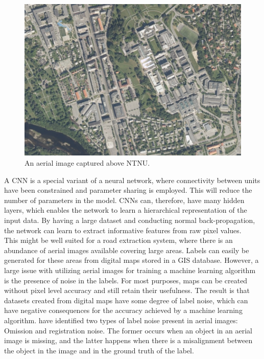\begin{figure}[t]
\begin{center}
\includegraphics[width=0.8\columnwidth]{figs/aerial_image.png}
\caption[Aerial image]{An aerial image captured above NTNU.}
\label{fig:aerialimage}
\end{center}
\end{figure}

A \ac{CNN} is a special variant of a neural network, where connectivity between units have been constrained and parameter sharing is employed. This will reduce the number of parameters in the model. \ac{CNN}s can, therefore, have many hidden layers, which enables the network to learn a hierarchical representation of the input data. By having a large dataset and conducting normal back-propagation, the network can learn to extract informative features from raw pixel values. \\

This might be well suited for a road extraction system, where there is an abundance of aerial images available covering large areas. Labels can easily be generated for these areas from digital maps stored in a \ac{GIS} database. However, a large issue with utilizing aerial images for training a machine learning algorithm is the presence of noise in the labels. For most purposes, maps can be created without pixel level accuracy and still retain their usefulness. The result is that datasets created from digital maps have some degree of label noise, which can have negative consequences for the accuracy achieved by a machine learning algorithm. \cite{Mnih_aerial_images_noisy} have identified two types of label noise present in aerial images: Omission and registration noise. The former occurs when an object in an aerial image is missing, and the latter happens when there is a misalignment between the object in the image and in the ground truth of the label.\\

